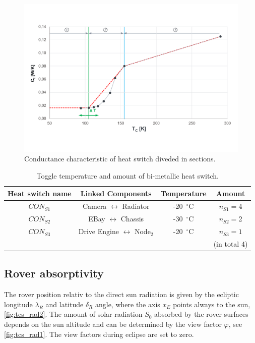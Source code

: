 \begin{figure}[H]
	\centering
	\includegraphics[width=1\textwidth]{Media/tcs_diag_section}
	\caption{Conductance characteristic of heat switch diveded in sections.}
	\label{fig:tcs_switch03}
\end{figure}


\begin{table}[H]
	\centering
	\caption{Toggle temperature and amount of bi-metallic heat switch.}
	\begin{tabular}{c@{\quad}ccc}
		\hline
		Heat switch name  & Linked Components & Temperature  & Amount \\ \hline
		$CON_{S1}$ & {Camera} $\leftrightarrow$ {Radiator} & -20\ $^\circ$C  & $n_{S1}=$4  \\[1em]
		$CON_{S2}$ & {EBay} $\leftrightarrow$ {Chassis} & -30\ $^\circ$C  & $n_{S2}=$2  \\[1em]
		$CON_{S3}$ & {Drive Engine} $\leftrightarrow$ {Node$_2$} & -20\ $^\circ$C  & $n_{S3}=1$  \\
	 			&											&						& (in total 4)  \\\hline
	\end{tabular}
	\label{tab:tcs_toggle}
\end{table}

\subsection{Rover absorptivity} \label{sec:app_therm_4}
The rover position relativ to the direct sun radiation is given by the ecliptic longitude $\lambda_R$ and latitude $\delta_R$ angle, where the axis $x_E$ points always to the sun, \autoref{fig:tcs_rad2}.
The amount of solar radiation $S_0$ absorbed by the rover surfaces depends on the sun altitude and can be determined by the view factor $\varphi$, see \autoref{fig:tcs_rad1}.
The view factors during eclipse are set to zero.

